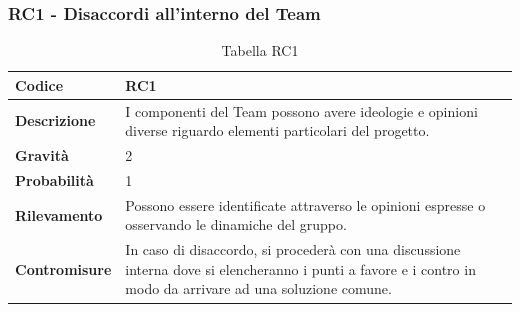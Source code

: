 \documentclass{article}
\begin{document}
    \subsubsection{RC1 - Disaccordi all’interno del Team}
    \begin{table}[H]
        \renewcommand{\arraystretch}{1.5}
        \centering
        \begin{tabular}{|p{3cm}|p{11cm}|}
            \hline
            \textbf{Codice} & RC1 \\
            \hline
            \textbf{Descrizione} & I componenti del Team possono avere ideologie e opinioni diverse riguardo elementi particolari del progetto. \\
            \hline
            \textbf{Gravità} & 2 \\
            \hline
            \textbf{Probabilità} & 1 \\
            \hline
            \textbf{Rilevamento} & Possono essere identificate attraverso le opinioni espresse o osservando le dinamiche del gruppo. \\
            \hline
            \textbf{Contromisure} & In caso di disaccordo, si procederà con una discussione interna dove si elencheranno i punti a favore e i contro in modo da arrivare ad una soluzione comune. \\
            \hline
        \end{tabular}
        \caption{Tabella RC1}
    \end{table}
\end{document}
